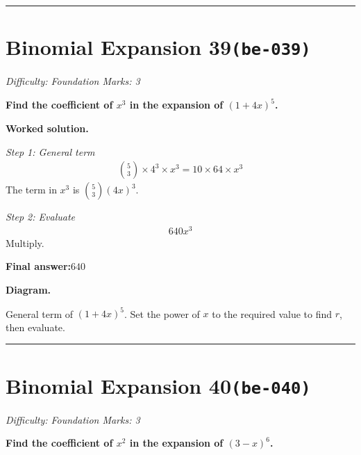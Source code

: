 \documentclass[11pt]{article}
\newcommand{\question}[1]{\par\medskip\noindent\textbf{#1}\par}
\begin{document}
\medskip\hrule

\section*{Binomial Expansion 39\quad\small\texttt{(be-039)}}
\textit{Difficulty: Foundation \quad\textbar\quad Marks: 3}

\question{Find the coefficient of \( x^3 \) in the expansion of \( (1 + 4x)^5 \).}

\textbf{Worked solution.}

\textit{Step 1: General term}
\[\begin{gathered}
\binom{5}{3} \times 4^3 \times x^3 = 10 \times 64 \times x^3
\end{gathered}\]
The term in \( x^3 \) is \( \binom{5}{3}(4x)^3 \).

\textit{Step 2: Evaluate}
\[\begin{gathered}
640x^3
\end{gathered}\]
Multiply.

\begin{answerbox}
\textbf{Final answer:}\quad \(\displaystyle 640\)
\end{answerbox}
\textbf{Diagram.}

\begin{center}
\end{center}
\small General term of $\left(1+4x\right)^{5}$. Set the power of $x$ to the required value to find $r$, then evaluate.\normalsize

\medskip\hrule

\section*{Binomial Expansion 40\quad\small\texttt{(be-040)}}
\textit{Difficulty: Foundation \quad\textbar\quad Marks: 3}

\question{Find the coefficient of \( x^2 \) in the expansion of \( (3 - x)^6 \).}
\end{document}
